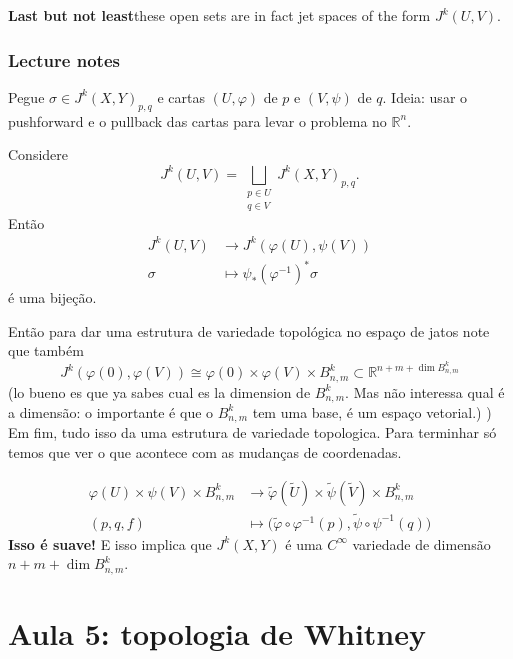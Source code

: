 \vspace{3em}
{\color{8}\bfseries Last but not least}\hspace{.5em}these open sets are in fact jet spaces of the form \(J^k(U,V)\).

\clearpage
\subsubsection{Lecture notes}

Pegue \(\sigma \in J^k(X,Y)_{p,q}\) e cartas \((U,\varphi)\) de \(p\) e \((V,\psi)\) de $q$. {\color{4}Ideia:} usar o pushforward e o pullback das cartas para levar o problema no \(\mathbb{R}^n\).

\begin{exercise}\leavevmode
Considere
\[J^k(U,V)= \bigsqcup_{\substack{p \in U \\ q \in V}}J^k(X,Y)_{p,q}.\]
Então
\begin{align*}
	J^k(U,V) &\longrightarrow J^k(\varphi(U),\psi(V)) \\
	\sigma &\longmapsto \psi_*(\varphi^{-1})^*\sigma
\end{align*}
é uma bijeção.
\end{exercise}
Então para dar uma estrutura de variedade topológica no espaço de jatos note que também
\[J^k(\varphi(0),\varphi(V))\cong \varphi(0) \times \varphi(V) \times B^k_{n,m}\subset \mathbb{R}^{n+m+ \dim B^k_{n,m}}\]
(lo bueno es que ya sabes cual es la dimension de \(B^k_{n,m}\). Mas não interessa qual é a dimensão: o importante é que o \(B^k_{n,m}\) tem uma base, é um espaço vetorial.)
)
Em fim, tudo isso da uma estrutura de variedade topologica. Para terminhar só temos que ver o que acontece com as mudanças de coordenadas.

\begin{align*}
	\varphi(U) \times \psi(V) \times B^k_{n,m}  &\longrightarrow \tilde{\varphi}(\tilde{U})\times \tilde{\psi}(\tilde{V}) \times B^k_{n,m} \\
	(p,q,f) &\longmapsto \Big(\tilde{\varphi} \circ \varphi^{-1}(p),\tilde{\psi} \circ \psi^{-1}(q) \Big)
\end{align*}
\textbf{Isso é suave!} E isso implica que \(J^k(X,Y)\) é uma \(C^\infty\) variedade de dimensão \(n+m+ \dim B^k_{n,m}\). 


\section{Aula 5: topologia de Whitney}

